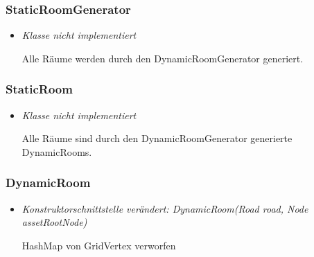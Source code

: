 \subsubsection{StaticRoomGenerator}
\begin{itemize}
    \item \textit{Klasse nicht implementiert}
        \begin{leftbar}[0.9\linewidth]
            Alle Räume werden durch den DynamicRoomGenerator generiert.\par
        \end{leftbar}
\end{itemize}

\subsubsection{StaticRoom}
\begin{itemize}
    \item \textit{Klasse nicht implementiert}
        \begin{leftbar}[0.9\linewidth]
            Alle Räume sind durch den DynamicRoomGenerator generierte DynamicRooms.\par
        \end{leftbar}
\end{itemize}

\subsubsection{DynamicRoom}
\begin{itemize}
    \item \textit{Konstruktorschnittstelle verändert: DynamicRoom(Road road, Node assetRootNode)}
        \begin{leftbar}[0.9\linewidth]
            HashMap von GridVertex verworfen\par
        \end{leftbar}
\end{itemize}


